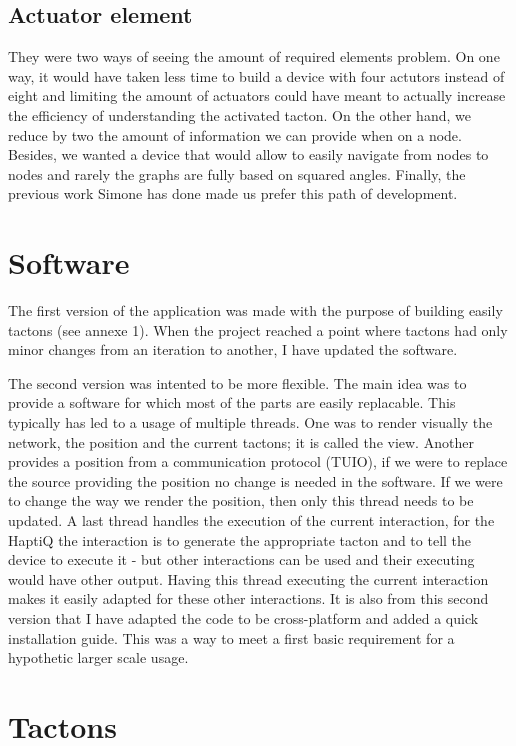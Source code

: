 \subsection{Actuator element}\label{actuator-element}

They were two ways of seeing the amount of required elements problem. On one way, it would have taken less time to build a device with four actutors instead of eight and limiting the amount of actuators could have meant to actually increase the efficiency of understanding the activated tacton. On the other hand, we reduce by two the amount of information we can provide when on a node. Besides, we wanted a device that would allow to easily navigate from nodes to nodes and rarely the graphs are fully based on squared angles. Finally, the previous work Simone has done made us prefer this path of development.

\section{Software}

The first version of the application was made with the purpose of building easily tactons (see annexe 1). When the project reached a point where tactons had only minor changes from an iteration to another, I have updated the software.

The second version was intented to be more flexible. The main idea was to provide a software for which most of the parts are easily replacable. This typically has led to a usage of multiple threads. One was to render visually the network, the position and the current tactons; it is called the view. Another provides a position from a communication protocol (TUIO), if we were to replace the source providing the position no change is needed in the software. If we were to change the way we render the position, then only this thread needs to be updated. A last thread handles the execution of the current interaction, for the HaptiQ the interaction is to generate the appropriate tacton and to tell the device to execute it - but other interactions can be used and their executing would have other output. Having this thread executing the current interaction makes it easily adapted for these other interactions. It is also from this second version that I have adapted the code to be cross-platform and added a quick installation guide. This was a way to meet a first basic requirement for a hypothetic larger scale usage.

\section{Tactons}


